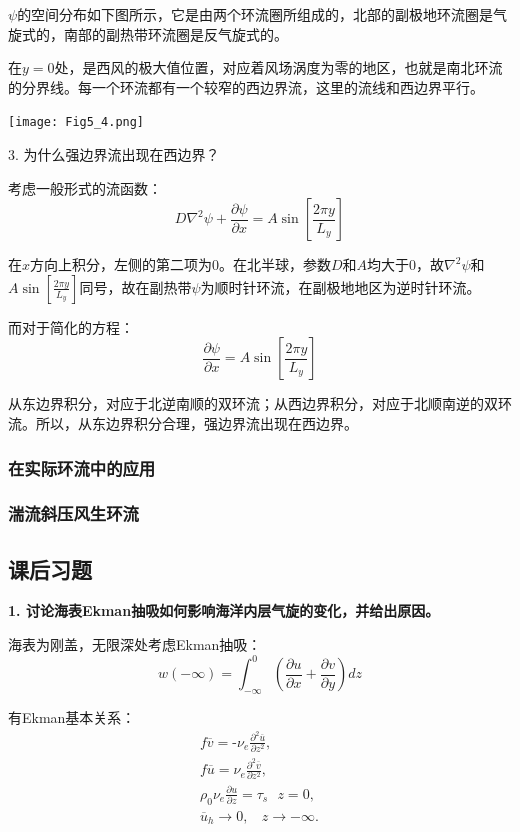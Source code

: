 \documentclass{article}
\begin{document}
$\psi$的空间分布如下图所示，它是由两个环流圈所组成的，北部的副极地环流圈是气旋式的，南部的副热带环流圈是反气旋式的。

在$y=0$处，是西风的极大值位置，对应着风场涡度为零的地区，也就是南北环流的分界线。每一个环流都有一个较窄的西边界流，这里的流线和西边界平行。
\begin{center}
    \texttt{[image: Fig5\_4.png]}
\end{center}

3. 为什么强边界流出现在西边界？

考虑一般形式的流函数：
$$D{{\nabla }^{2}}\psi +\frac{\partial \psi }{\partial x}=A\sin [ \frac{2\pi y}{{{L}_{y}}}] $$

在$x$方向上积分，左侧的第二项为$0$。在北半球，参数$D$和$A$均大于$0$，故${\nabla }^{2}\psi$和$A\sin [ \frac{2\pi y}{{{L}_{y}}}]$同号，故在副热带$\psi$为顺时针环流，在副极地地区为逆时针环流。

而对于简化的方程：
$$\frac{\partial \psi }{\partial x}=A\sin \left[ \frac{2\pi y}{{{L}_{y}}} \right]$$

从东边界积分，对应于北逆南顺的双环流；从西边界积分，对应于北顺南逆的双环流。所以，从东边界积分合理，强边界流出现在西边界。

\subsubsection{在实际环流中的应用}
\subsubsection{湍流斜压风生环流}

\subsection{课后习题}
\textbf{1. 讨论海表Ekman抽吸如何影响海洋内层气旋的变化，并给出原因。}

海表为刚盖，无限深处考虑Ekman抽吸：
$$w(-\infty) = \int_{-\infty}^0(\frac{\partial u}{\partial x} 
+ \frac{\partial v}{\partial y})dz$$

有Ekman基本关系：
\begin{align}
    & f\overline{v}=\text{-}{{\nu }_{e}}\frac{{{\partial }^{2}}\overline{u}}{\partial {{z}^{2}}}, \\ 
   & f\overline{u}={{\nu }_{e}}\frac{{{\partial }^{2}}\overline{v}}{\partial {{z}^{2}}}, \\ 
   & \rho_0\nu_e\frac{\partial u}{\partial z} = \tau_s\ \ \ z=0, \\ 
   & {{\overline{u}}_{h}}\to 0,\ \ \ \ z\to -\infty .\ \ \ \  
\end{align}
\end{document}
